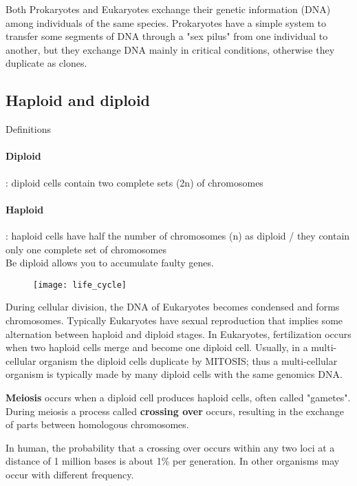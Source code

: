Both Prokaryotes and Eukaryotes exchange their genetic information (DNA)
among individuals of the same species. Prokaryotes have a simple system to
transfer some segments of DNA through a "sex pilus" from one individual to
another, but they exchange DNA mainly in critical conditions, otherwise they
duplicate as clones.

\subsection{Haploid and diploid}

Definitions

\paragraph*{Diploid}: diploid cells contain two complete sets (2n) of chromosomes

\paragraph*{Haploid}: haploid cells have half the number of chromosomes (n) as 
diploid / they contain only one complete set of chromosomes\\


Be diploid allows you to accumulate faulty genes.

\begin{figure}[H]
  \centering
  \texttt{[image: life\_cycle]}
\end{figure}

During cellular division, the DNA of Eukaryotes becomes condensed and forms
chromosomes. Typically Eukaryotes have sexual reproduction that implies some
alternation between haploid and diploid stages. In Eukaryotes, fertilization
occurs when two haploid cells merge and become one diploid cell. Usually, in a
multi-cellular organism the diploid cells duplicate by MITOSIS; thus a
multi-cellular organism is typically made by many diploid cells with the same
genomics DNA. 

\textbf{Meiosis} occurs when a diploid cell produces haploid cells, often
called "gametes". During meiosis a process called \textbf{crossing over} occurs,
resulting in the exchange of parts between homologous chromosomes. 

In human, the probability that a crossing over occurs within any two loci at 
a distance of 1 million bases is about 1\% per generation. 
In other organisms may occur with different frequency. 

